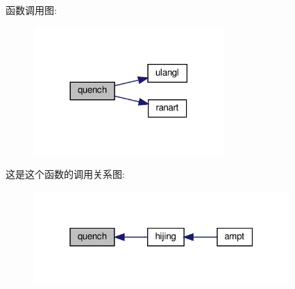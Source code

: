 函数调用图\+:
\nopagebreak
\begin{figure}[H]
\begin{center}
\leavevmode
\includegraphics[width=206pt]{quench_8f90_abed4820fe11150754b89d06f48197f78_cgraph}
\end{center}
\end{figure}
这是这个函数的调用关系图\+:
\nopagebreak
\begin{figure}[H]
\begin{center}
\leavevmode
\includegraphics[width=277pt]{quench_8f90_abed4820fe11150754b89d06f48197f78_icgraph}
\end{center}
\end{figure}
